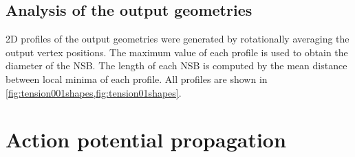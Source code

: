 \documentclass[11pt]{article}
\begin{document}
\subsection{Analysis of the output geometries}

2D profiles of the output geometries were generated by rotationally averaging the output vertex positions.
The maximum value of each profile is used to obtain the diameter of the NSB.
The length of each NSB is computed by the mean distance between local minima of each profile.
All profiles are shown in \cref{fig:tension001shapes,fig:tension01shapes}.



\section{Action potential propagation}
\end{document}

